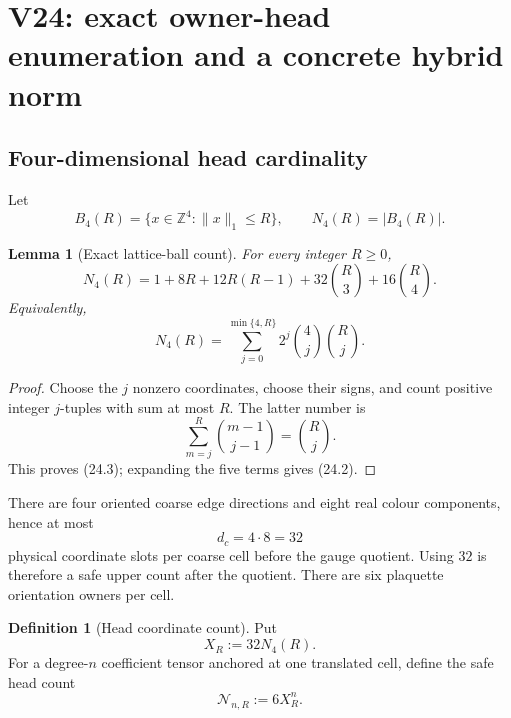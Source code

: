 \documentclass[11pt,oneside]{book}
\newtheorem{lemma}[theorem]{Lemma}
\theoremstyle{definition}
\newtheorem{definition}[theorem]{Definition}
\theoremstyle{remark}
\begin{document}


\section{V24: exact owner-head enumeration and a concrete hybrid norm}
\label{sec:e8v24}

\subsection{Four-dimensional head cardinality}

Let
\[
 B_4(R)=\{x\in\mathbb Z^4:\|x\|_1\leq R\},\qquad
 N_4(R)=|B_4(R)|.                                  \tag{24.1}
\]

\begin{lemma}[Exact lattice-ball count]
\label{lem:e8v24-ball}
For every integer \(R\geq0\),
\[
\boxed{\quad
N_4(R)=
1+8R+12R(R-1)
+32\binom R3+16\binom R4.
\quad}                                             \tag{24.2}
\]
Equivalently,
\[
N_4(R)=\sum_{j=0}^{\min\{4,R\}}
        2^j\binom4j\binom Rj.                       \tag{24.3}
\]
\end{lemma}

\begin{proof}
Choose the \(j\) nonzero coordinates, choose their signs, and count
positive integer \(j\)-tuples with sum at most \(R\).  The latter
number is
\[
\sum_{m=j}^R\binom{m-1}{j-1}=\binom Rj.
\]
This proves (24.3); expanding the five terms gives (24.2).
\end{proof}

There are four oriented coarse edge directions and eight real colour
components, hence at most
\[
                         d_c=4\cdot8=32                            \tag{24.4}
\]
physical coordinate slots per coarse cell before the gauge quotient.
Using \(32\) is therefore a safe upper count after the quotient.
There are six plaquette orientation owners per cell.

\begin{definition}[Head coordinate count]
\label{def:e8v24-head-count}
Put
\[
                         X_R:=32N_4(R).                            \tag{24.5}
\]
For a degree-\(n\) coefficient tensor anchored at one translated cell,
define the safe head count
\[
                         \mathcal N_{n,R}:=6X_R^n.                 \tag{24.6}
\]
\end{definition}
\end{document}
